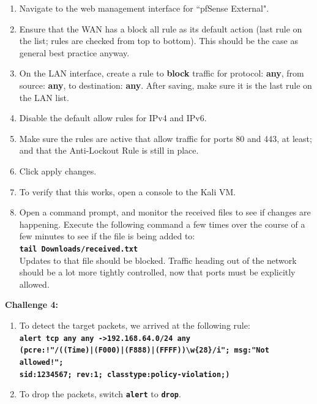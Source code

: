 \documentclass[12pt]{extarticle}
\begin{document}
\begin{enumerate}
	\item Navigate to the web management interface for ``pfSense External".
	\item Ensure that the WAN has a block all rule as its default action (last rule on the list; rules are checked from top to bottom). This should be the case as general best practice anyway.
	\item On the LAN interface, create a rule to \textbf{block} traffic for protocol: \textbf{any}, from source: \textbf{any}, to destination: \textbf{any}. After saving, make sure it is the last rule on the LAN list.
	\item Disable the default allow rules for IPv4 and IPv6.
	\item Make sure the rules are active that allow traffic for ports 80 and 443, at least; and that the Anti-Lockout Rule is still in place.
	\item Click apply changes.
	\item To verify that this works, open a console to the Kali VM.
	\item Open a command prompt, and monitor the received files to see if changes are happening. Execute the following command a few times over the course of a few minutes to see if the file is being added to:\\
	
	\texttt{\textbf{tail Downloads/received.txt}}\\
	
	Updates to that file should be blocked. Traffic heading out of the network should be a lot more tightly controlled, now that ports must be explicitly allowed.

\end{enumerate}


\noindent
\textbf{Challenge 4:}
\begin{enumerate}
	\item To detect the target packets, we arrived at the following rule:\\
	\texttt{\textbf{alert tcp any any -\textgreater  192.168.64.0/24 any}}\\%
	\texttt{\textbf{(pcre:!"/((Time)|(F000)|(F888)|(FFFF))\textbackslash w\{28\}/i"; msg:"Not allowed!";}}\\%
	\texttt{\textbf{sid:1234567; rev:1; classtype:policy-violation;)}}
	\item To drop the packets, switch \texttt{\textbf{alert}} to \texttt{\textbf{drop}}.
\end{enumerate}
\end{document}
